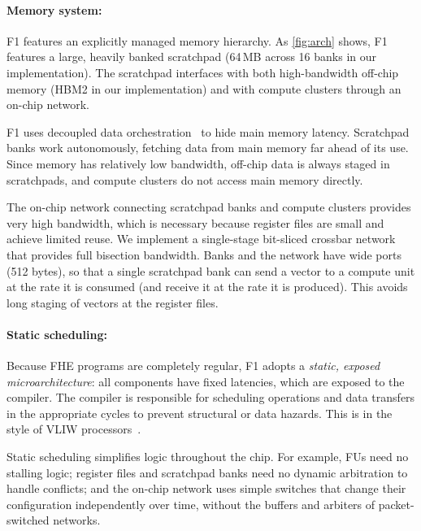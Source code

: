 
\figArch


\paragraph{Memory system:}
F1 features an explicitly managed memory hierarchy. As \autoref{fig:arch} shows,
F1 features a large, heavily banked scratchpad (64\,MB across {16} banks in our implementation).
The scratchpad interfaces with both high-bandwidth off-chip memory (HBM2 in our implementation)
and with compute clusters through an on-chip network.

F1 uses decoupled data orchestration~\cite{pellauer:asplos19:buffets} to hide main memory latency.
Scratchpad banks work autonomously, fetching data from main memory far ahead of its use.
Since memory has relatively low bandwidth, off-chip data is always staged in scratchpads,
and compute clusters do not access main memory directly.

The on-chip network connecting scratchpad banks and compute clusters provides very high bandwidth,
which is necessary because register files are small and achieve limited reuse.
We implement a single-stage bit-sliced crossbar network~\cite{passas:tocaid12:crossbar} that provides full bisection bandwidth.
Banks and the network have wide ports (512 bytes), so that a single scratchpad bank can send a vector to a compute unit
at the rate it is consumed (and receive it at the rate it is produced).
This avoids long staging of vectors at the register files.

\paragraph{Static scheduling:}
Because FHE programs are completely regular, F1 adopts a \emph{static, exposed microarchitecture}:
all components have fixed latencies, which are exposed to the compiler.
The compiler is responsible for scheduling operations and data transfers in the appropriate cycles to prevent
structural or data hazards.
This is in the style of VLIW processors~\cite{fisher:isca83:very}.

Static scheduling simplifies logic throughout the chip. For example, FUs need no stalling logic;
register files and scratchpad banks need no dynamic arbitration to handle conflicts;
and the on-chip network uses simple switches that change their configuration independently over time,
without the buffers and arbiters of packet-switched networks.

